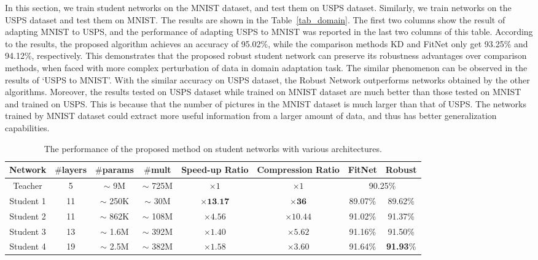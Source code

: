 \documentclass[journal]{IEEEtran}
\newcommand{\Tref}[1]{Table~\ref{#1}}
\begin{document}
In this section, we train student networks on the MNIST dataset, and test them on USPS dataset. Similarly, we train networks on the USPS dataset and test them on MNIST. The results are shown in the \Tref{tab_domain}. The first two columns show the result of adapting MNIST to USPS, and the performance of adapting USPS to MNIST was reported in the last two columns of this table. According to the results, the proposed algorithm achieves an accuracy of 95.02\%, while the comparison methods KD and FitNet only get 93.25\% and 94.12\%, respectively. This demonstrates that the proposed robust student network can preserve its robustness advantages over comparison methods, when faced with more complex perturbation of data in domain adaptation task. The similar phenomenon can be observed in the results of `USPS to MNIST'. With the similar accuracy on USPS dataset, the Robust Network outperforms networks obtained by the other algorithms. Moreover, the results tested on USPS dataset while trained on MNIST dataset are much better than those tested on MNIST and trained on USPS. This is because that the number of pictures in the MNIST dataset is much larger than that of USPS. The networks trained by MNIST dataset could extract more useful information from a larger amount of data, and thus has better generalization capabilities. 

\begin{table*}[htb]
\setlength{\abovecaptionskip}{0.2cm}
\setlength{\belowcaptionskip}{0.2cm}
\renewcommand\arraystretch{1}
\centering
\small
\caption{The performance of the proposed method on student networks with various architectures.}
\begin{tabular}{|c|c|c|c|c|c|c|c|}
\hline
\textbf{Network}  &  \textbf{$\#$\textbf{layers}}  &  \textbf{$\#$\textbf{params}}  &  \textbf{$\#$\textbf{mult}}  &  \textbf{\textbf{Speed-up Ratio}}  &  \textbf{\textbf{Compression Ratio}}  &  \textbf{\textbf{FitNet}}  &  \textbf{\textbf{Robust}}\\
\hline
\hline
Teacher  &  5  &  $\sim$ 9M  &  $\sim$ 725M  &  $\times 1$  &  $\times 1$  &  \multicolumn{2}{c|}{ 90.25\%}    \\
\hline
Student 1  &  11  &  $\sim$ 250K  &  $\sim$ 30M  &  $\times \textbf{13.17}$  &  $\times \textbf{36}$  &  89.07\%  &  89.62\%    \\
\hline
Student 2  &  11  &  $\sim$ 862K  &  $\sim$ 108M  &  $\times 4.56$  &  $\times 10.44$  &  91.02\%  &  91.37\%    \\
\hline
Student 3  &  13  &  $\sim$ 1.6M  &  $\sim$ 392M  &  $\times 1.40$  &  $\times 5.62$  &  91.16\%  &  91.50\%    \\
\hline
Student 4  &  19  &  $\sim$ 2.5M  &  $\sim$ 382M  &  $\times 1.58$  &  $\times 3.60$  &  91.64\%  &  \textbf{91.93}\%    \\
\hline
\end{tabular}
\label{tab_students_result}
\end{table*} 
\end{document}
